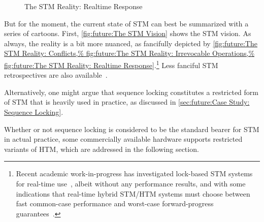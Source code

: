 \begin{figure}
\centering
{}
\caption{The STM Reality:
			  Realtime Response}
\end{figure}

But for the moment, the current state of STM
can best be summarized with a series of cartoons.
First,
\cref{fig:future:The STM Vision}
shows the STM vision.
As always, the reality is a bit more nuanced, as fancifully depicted by
\cref{fig:future:The STM Reality: Conflicts,%
fig:future:The STM Reality: Irrevocable Operations,%
fig:future:The STM Reality: Realtime Response}.\footnote{
	Recent academic work-in-progress has investigated lock-based STM
	systems for real-time use~\cite{JimAnderson2019STMRT,CatherineNemitz2018LockSTMrealtime},
	albeit without any performance results, and with some indications
	that real-time hybrid STM/HTM systems must choose between fast
	common-case performance and worst-case forward-progress
	guarantees~\cite{DBLP:journals/corr/AlistarhKKRS14,MartinSchoeberl2010realtimeTM}.}
Less fanciful STM retrospectives are also
available~\cite{JoeDuffy2010RetroTM,JoeDuffy2010RetroTM2}.

Alternatively, one might argue that sequence locking constitutes a
restricted form of STM that is heavily used in practice, as discussed in
\cref{sec:future:Case Study: Sequence Locking}.

Whether or not sequence locking is considered to be the standard bearer
for STM in actual practice, some commercially available hardware supports
restricted variants of HTM, which are addressed in the following section.
